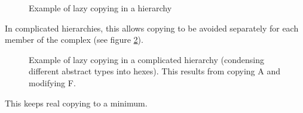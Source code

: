\begin{figure}
\begin{center}
\caption{Example of lazy copying in a hierarchy}
\label{lch}
\end{center}
\end{figure}

In complicated hierarchies, this allows copying to be avoided
separately for each member of the complex (see figure \ref{biglch}).
\begin{figure}
\begin{center}
\caption{Example of lazy copying in a complicated hierarchy (condensing
different abstract types into hexes).  This results from copying 
A and modifying F.}
\label{biglch}
\end{center}
\end{figure}
This keeps real copying to a minimum.
